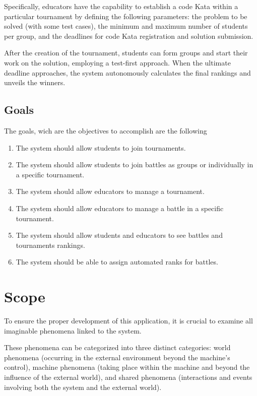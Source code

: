 \documentclass[12pt, a4paper]{report}
\begin{document}
    Specifically, educators have the capability to establish a code Kata within a particular tournament by defining the following parameters: the problem to be solved 
    (with some test cases), the minimum and maximum number of students per group, and the deadlines for code Kata registration and solution submission.
    
    After the creation of the tournament, students can form groups and start their work on the solution, employing a test-first approach. When the ultimate deadline 
    approaches, the system autonomously calculates the final rankings and unveils the winners.

    \subsection{Goals}
    The goals, wich are the objectives to accomplish are the following
    \begin{enumerate}
        \item The system should allow students to join tournaments.
        \item The system should allow students to join battles as groups or individually in a specific tournament.
        \item The system should allow educators to manage a tournament.
        \item The system should allow educators to manage a battle in a specific tournament.
        \item The system should allow students and educators to see battles and tournaments rankings.
        \item The system should be able to assign automated ranks for battles.
    \end{enumerate}


    \section{Scope}
    To ensure the proper development of this application, it is crucial to examine all imaginable phenomena linked to the system.
    
    These phenomena can be categorized into three distinct categories: world phenomena (occurring in the external environment beyond the machine's control), machine 
    phenomena (taking place within the machine and beyond the influence of the external world), and shared phenomena (interactions and events involving both the system
    and the external world).
\end{document}
